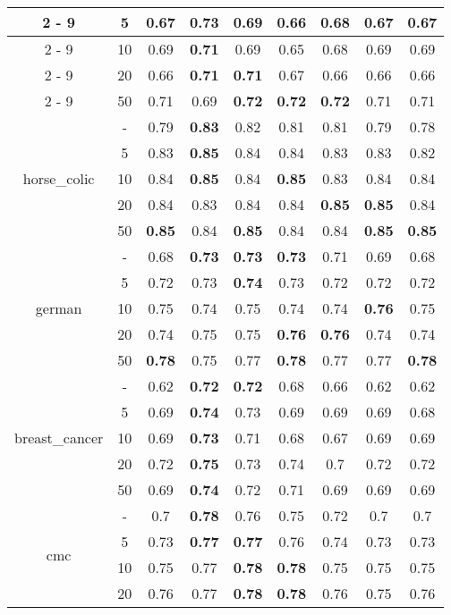 \documentclass{article}%
\begin{document}
\begin{longtable}{c|c|ccccccc}
\cline{2%
-%
9}%
&5&0.67&\textbf{0.73}&0.69&0.66&0.68&0.67&0.67\\%
\cline{2%
-%
9}%
&10&0.69&\textbf{0.71}&0.69&0.65&0.68&0.69&0.69\\%
\cline{2%
-%
9}%
&20&0.66&\textbf{0.71}&\textbf{0.71}&0.67&0.66&0.66&0.66\\%
\cline{2%
-%
9}%
&50&0.71&0.69&\textbf{0.72}&\textbf{0.72}&\textbf{0.72}&0.71&0.71\\%
\hline%
\multirow{5}{*}{horse\_colic}&{-}&0.79&\textbf{0.83}&0.82&0.81&0.81&0.79&0.78\\%
\cline{2%
-%
9}%
&5&0.83&\textbf{0.85}&0.84&0.84&0.83&0.83&0.82\\%
\cline{2%
-%
9}%
&10&0.84&\textbf{0.85}&0.84&\textbf{0.85}&0.83&0.84&0.84\\%
\cline{2%
-%
9}%
&20&0.84&0.83&0.84&0.84&\textbf{0.85}&\textbf{0.85}&0.84\\%
\cline{2%
-%
9}%
&50&\textbf{0.85}&0.84&\textbf{0.85}&0.84&0.84&\textbf{0.85}&\textbf{0.85}\\%
\hline%
\multirow{5}{*}{german}&{-}&0.68&\textbf{0.73}&\textbf{0.73}&\textbf{0.73}&0.71&0.69&0.68\\%
\cline{2%
-%
9}%
&5&0.72&0.73&\textbf{0.74}&0.73&0.72&0.72&0.72\\%
\cline{2%
-%
9}%
&10&0.75&0.74&0.75&0.74&0.74&\textbf{0.76}&0.75\\%
\cline{2%
-%
9}%
&20&0.74&0.75&0.75&\textbf{0.76}&\textbf{0.76}&0.74&0.74\\%
\cline{2%
-%
9}%
&50&\textbf{0.78}&0.75&0.77&\textbf{0.78}&0.77&0.77&\textbf{0.78}\\%
\hline%
\multirow{5}{*}{breast\_cancer}&{-}&0.62&\textbf{0.72}&\textbf{0.72}&0.68&0.66&0.62&0.62\\%
\cline{2%
-%
9}%
&5&0.69&\textbf{0.74}&0.73&0.69&0.69&0.69&0.68\\%
\cline{2%
-%
9}%
&10&0.69&\textbf{0.73}&0.71&0.68&0.67&0.69&0.69\\%
\cline{2%
-%
9}%
&20&0.72&\textbf{0.75}&0.73&0.74&0.7&0.72&0.72\\%
\cline{2%
-%
9}%
&50&0.69&\textbf{0.74}&0.72&0.71&0.69&0.69&0.69\\%
\hline%
\multirow{5}{*}{cmc}&{-}&0.7&\textbf{0.78}&0.76&0.75&0.72&0.7&0.7\\%
\cline{2%
-%
9}%
&5&0.73&\textbf{0.77}&\textbf{0.77}&0.76&0.74&0.73&0.73\\%
\cline{2%
-%
9}%
&10&0.75&0.77&\textbf{0.78}&\textbf{0.78}&0.75&0.75&0.75\\%
\cline{2%
-%
9}%
&20&0.76&0.77&\textbf{0.78}&\textbf{0.78}&0.76&0.75&0.76\\%

\end{longtable}
\end{document}

